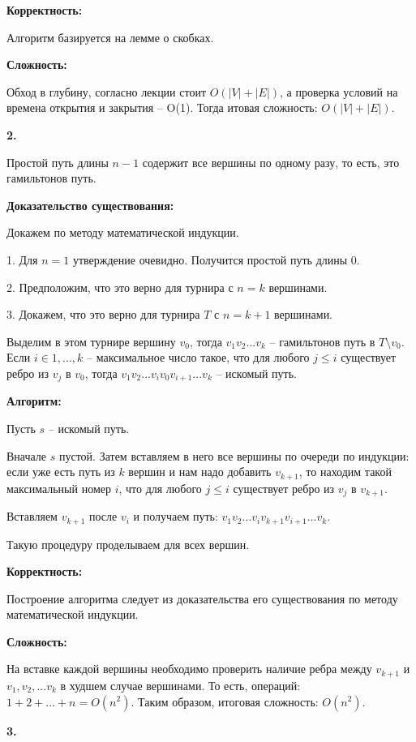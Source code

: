 \documentclass[12pt]{extreport}
\begin{document}
\bigskip 
{\bf Корректность:}

Алгоритм базируется на лемме о скобках. 

\bigskip 
{\bf Сложность:} 

Обход в глубину, согласно лекции стоит $O(|V|+|E|)$, а проверка условий на времена открытия и закрытия -- O(1). Тогда итовая сложность: $O(|V|+|E|)$.

\bigskip 
{\bf 2.} 

Простой путь длины $n-1$ содержит все вершины по одному разу, то есть, это гамильтонов путь. 

{\bf Доказательство существования:}

Докажем по методу математической индукции. 

1. Для $n=1$ утверждение очевидно. Получится простой путь длины 0.

2. Предположим, что это верно для турнира с $n=k$ вершинами.

3. Докажем, что это верно для турнира $T$ с $n=k+1$  вершинами.

Выделим в этом турнире вершину $v_0$, тогда $v_1 v_2...v_k$ -- гамильтонов путь в $T \setminus v_0$.  Если $i \in {1, ..., k}$ -- максимальное число такое, что для любого $j\leq i$ существует ребро из $v_j$ в $v_0$, тогда $v_1v_2...v_i v_0 v_{i+1}...v_{k}$ -- искомый путь.

{\bf Алгоритм: }

Пусть $s$ -- искомый путь.

Вначале $s$ пустой. Затем вставляем в него все вершины по очереди по индукции: если уже есть путь из $k$ вершин и нам надо добавить $v_{k+1}$, то находим такой максимальный номер $i$, что для любого $j\leq i$ существует ребро из $v_j$ в $v_{k+1}$. 

Вставляем $v_{k+1}$ после $v_i$ и получаем путь: $v_1v_2...v_i v_{k+1} v_{i+1}...v_{k}$. 

Такую процедуру проделываем для всех вершин. 

\bigskip 
{\bf Корректность:}

Построение алгоритма следует из доказательства его существования по методу математической индукции.

\bigskip 
{\bf Сложность:} 

На вставке каждой вершины необходимо проверить наличие ребра между $v_{k+1}$ и $v_1, v_2, ... v_k $ в худшем случае вершинами. То есть, операций: $1+2+...+n = O(n^2)$. Таким образом, итоговая сложность: $O(n^2)$.

\bigskip 
{\bf 3.} 
\end{document}
